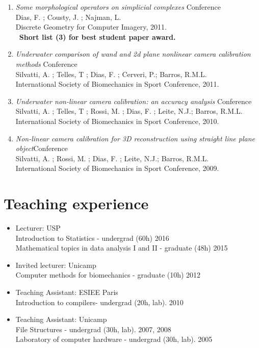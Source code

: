 \documentclass[12pt]{article}
\newcommand{\pub}[4]{
  {\emph{#1}\hfill{\small#2}\\
    #3\\
    #4}}
\begin{document}
\begin{enumerate}
\item{
  \pub
      {Some morphological operators on simplicial complexes }{ Conference}
      {Dias, F. ; Cousty, J. ; Najman, L.}
      {Discrete Geometry for Computer Imagery, 2011.}
      \\~\textbf{Short list (3) for best student paper award.}
}


\item{
  \pub
      {Underwater comparison of wand and 2d plane nonlinear camera calibration methods }{ Conference}
      {Silvatti, A. ; Telles, T ; Dias, F. ; Cerveri, P.; Barros, R.M.L.}
      {International Society of Biomechanics in Sport Conference, 2011.}
}

\item{
  \pub
      {Underwater non-linear camera calibration: an accuracy analysis }{ Conference}
      {Silvatti, A. ; Telles, T ; Rossi, M. ; Dias, F. ; Leite, N.J.; Barros, R.M.L.}
      {International Society of Biomechanics in Sport Conference, 2010.}
}


\item{
  \pub
      {Non-linear camera calibration for 3D reconstruction using straight line plane object}{Conference}
      {Silvatti, A. ; Rossi, M. ; Dias, F. ; Leite, N.J.; Barros, R.M.L.}
      {International Society of Biomechanics in Sport Conference, 2009.}
}

\end{enumerate}



\section*{Teaching experience}

\begin{itemize}
  \item{Lecturer: \hfill USP\\
    Introduction to Statistics - undergrad (60h) \hfill 2016\\
    Mathematical topics in data analysis I and II - graduate (48h) \hfill 2015
  }
  \item{Invited lecturer: \hfill Unicamp\\
    Computer methods for biomechanics - graduate (10h) \hfill 2012
  }
  \item{Teaching Assistant: \hfill ESIEE Paris\\
    Introduction to compilers- undergrad (20h, lab). \hfill 2010
  }
  \item{Teaching Assistant: \hfill Unicamp\\
    File Structures - undergrad (30h, lab). \hfill 2007, 2008\\
    Laboratory of computer hardware - undergrad (30h, lab). \hfill 2005
  }


        
\end{itemize}   
\end{document}
